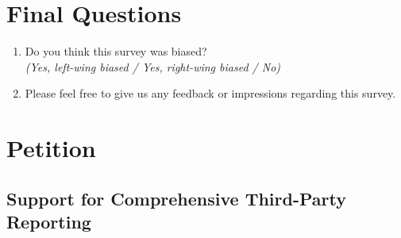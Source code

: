 \documentclass[11pt]{article}
\begin{document}
\section*{Final Questions}
\begin{enumerate}[resume]
    \item Do you think this survey was biased?\\ \textit{(Yes, left-wing biased / Yes, right-wing biased / No)}
    \item Please feel free to give us any feedback or impressions regarding this survey.
\end{enumerate}    
\section*{Petition}
\subsection*{Support for Comprehensive Third-Party Reporting}
\end{document}
